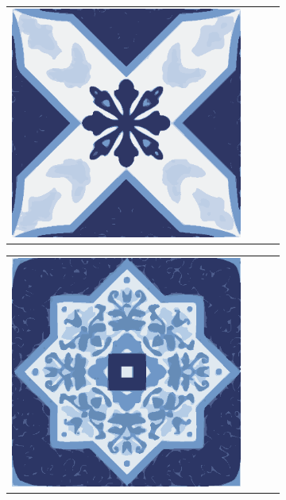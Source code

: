 \documentclass{oci}
\begin{document}
\begin{problemDescription}
\begin{figure}[h]
\begin{subfigure}{0.45\textwidth}
\begin{center}
{\begin{tabular}{cccc}
        \includegraphics[scale=0.3]{b.eps}
      \end{tabular}
    }
  \end{center}
\end{subfigure}
\begin{subfigure}{0.45\textwidth}
  \begin{center}
    {
      \renewcommand{\arraystretch}{0.25}
      \begin{tabular}{cccc}
        \includegraphics[scale=0.3]{a.eps} &

\end{tabular}}
\end{center}
\end{subfigure}
\end{figure}
\end{problemDescription}
\end{document}
